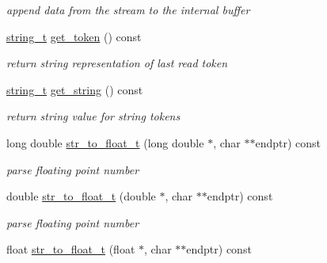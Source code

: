 \begin{DoxyCompactItemize}
\begin{DoxyCompactList}\small\item\em append data from the stream to the internal buffer \end{DoxyCompactList}\item 
\hypertarget{classnlohmann_1_1basic__json_1_1lexer_a0eab4ce848cefe355dd0d61f9a5348a0_a0eab4ce848cefe355dd0d61f9a5348a0}{\hyperlink{classnlohmann_1_1basic__json_ab63e618bbb0371042b1bec17f5891f42_ab63e618bbb0371042b1bec17f5891f42}{string\-\_\-t} \hyperlink{classnlohmann_1_1basic__json_1_1lexer_a0eab4ce848cefe355dd0d61f9a5348a0_a0eab4ce848cefe355dd0d61f9a5348a0}{get\-\_\-token} () const }\label{classnlohmann_1_1basic__json_1_1lexer_a0eab4ce848cefe355dd0d61f9a5348a0_a0eab4ce848cefe355dd0d61f9a5348a0}

\begin{DoxyCompactList}\small\item\em return string representation of last read token \end{DoxyCompactList}\item 
\hyperlink{classnlohmann_1_1basic__json_ab63e618bbb0371042b1bec17f5891f42_ab63e618bbb0371042b1bec17f5891f42}{string\-\_\-t} \hyperlink{classnlohmann_1_1basic__json_1_1lexer_a18dc059f3a96af88104ca02d919c16b5_a18dc059f3a96af88104ca02d919c16b5}{get\-\_\-string} () const 
\begin{DoxyCompactList}\small\item\em return string value for string tokens \end{DoxyCompactList}\item 
long double \hyperlink{classnlohmann_1_1basic__json_1_1lexer_a541f1cd06178fefc5ddde34022852c10_a541f1cd06178fefc5ddde34022852c10}{str\-\_\-to\-\_\-float\-\_\-t} (long double $\ast$, char $\ast$$\ast$endptr) const 
\begin{DoxyCompactList}\small\item\em parse floating point number \end{DoxyCompactList}\item 
double \hyperlink{classnlohmann_1_1basic__json_1_1lexer_a29d53d1c76a58b7f4d1315d44665eab3_a29d53d1c76a58b7f4d1315d44665eab3}{str\-\_\-to\-\_\-float\-\_\-t} (double $\ast$, char $\ast$$\ast$endptr) const 
\begin{DoxyCompactList}\small\item\em parse floating point number \end{DoxyCompactList}\item 
float \hyperlink{classnlohmann_1_1basic__json_1_1lexer_aea092725cd2b01e84126898f080418d6_aea092725cd2b01e84126898f080418d6}{str\-\_\-to\-\_\-float\-\_\-t} (float $\ast$, char $\ast$$\ast$endptr) const 
$$
\end{DoxyCompactItemize}
